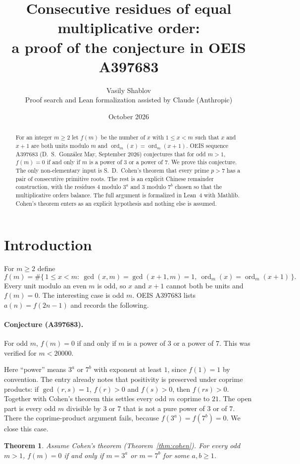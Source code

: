 \documentclass[11pt]{article}
\title{Consecutive residues of equal multiplicative order:\\
a proof of the conjecture in OEIS A397683}
\author{Vasily Shablov\\[2pt]
\small Proof search and Lean formalization assisted by Claude (Anthropic)}
\date{October 2026}
\newtheorem{theorem}{Theorem}
\theoremstyle{remark}
\newcommand{\ord}{\operatorname{ord}}
\begin{document}
\maketitle

\begin{abstract}
For an integer $m\ge 2$ let $f(m)$ be the number of $x$ with $1\le x<m$ such that $x$ and
$x+1$ are both units modulo $m$ and $\ord_m(x)=\ord_m(x+1)$. OEIS sequence A397683
(D.~S.~Gonz\'alez May, September 2026) conjectures that for odd $m>1$, $f(m)=0$ if and only if
$m$ is a power of $3$ or a power of $7$. We prove this conjecture. The only non-elementary
input is S.~D.~Cohen's theorem that every prime $p>7$ has a pair of consecutive primitive
roots. The rest is an explicit Chinese remainder construction, with the residues $4$ modulo
$3^a$ and $3$ modulo $7^b$ chosen so that the multiplicative orders balance. The full argument
is formalized in Lean~4 with Mathlib. Cohen's theorem enters as an explicit hypothesis and
nothing else is assumed.
\end{abstract}

\section{Introduction}

For $m\ge 2$ define
\[
  f(m)=\#\{\,1\le x<m:\ \gcd(x,m)=\gcd(x+1,m)=1,\ \ord_m(x)=\ord_m(x+1)\,\}.
\]
Every unit modulo an even $m$ is odd, so $x$ and $x+1$ cannot both be units and $f(m)=0$.
The interesting case is odd $m$. OEIS A397683 lists $a(n)=f(2n-1)$ and records the following.

\paragraph{Conjecture (A397683).} For odd $m$, $f(m)=0$ if and only if $m$ is a power of $3$
or a power of $7$. This was verified for $m<20000$.

Here ``power'' means $3^a$ or $7^b$ with exponent at least $1$, since $f(1)=1$ by convention.
The entry already notes that positivity is preserved under coprime products: if
$\gcd(r,s)=1$, $f(r)>0$ and $f(s)>0$, then $f(rs)>0$. Together with Cohen's theorem this settles
every odd $m$ coprime to $21$. The open part is every odd $m$ divisible by $3$ or $7$ that is
not a pure power of $3$ or of $7$. There the coprime-product argument fails, because
$f(3^a)=f(7^b)=0$. We close this case.

\begin{theorem}\label{thm:main}
Assume Cohen's theorem (Theorem~\ref{thm:cohen}). For every odd $m>1$, $f(m)=0$ if and only if
$m=3^a$ or $m=7^b$ for some $a,b\ge 1$.
\end{theorem}
\end{document}
